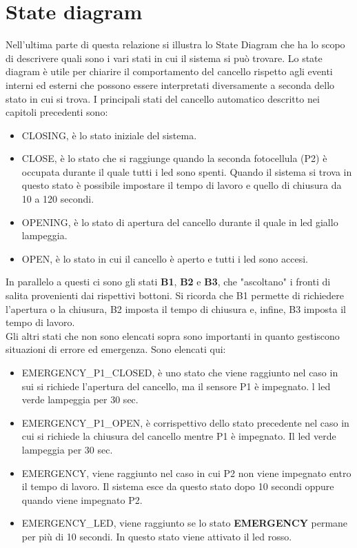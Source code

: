\documentclass[12pt]{article}
\begin{document}
\newpage

\section{State diagram}
Nell'ultima parte di questa relazione si illustra lo State Diagram che ha lo scopo di descrivere quali sono i vari stati in cui il sistema si può trovare. Lo state diagram è utile per chiarire il comportamento del cancello rispetto agli eventi interni ed esterni che possono essere interpretati diversamente a seconda dello stato in cui si trova.
I principali stati del cancello automatico descritto nei capitoli precedenti sono:
\begin{itemize}
    \item{CLOSING,} è lo stato iniziale del sistema.
    \item{CLOSE,} è lo stato che si raggiunge quando la seconda fotocellula (P2) è occupata durante il quale tutti i led sono spenti. Quando il sistema si trova in questo stato è possibile impostare il tempo di lavoro e quello di chiusura da 10 a 120 secondi.
    \item{OPENING,} è lo stato di apertura del cancello durante il quale in led giallo lampeggia.
    \item{OPEN,} è lo stato in cui il cancello è aperto e tutti i led sono accesi.
\end{itemize}

In parallelo a questi ci sono gli stati \textbf{B1}, \textbf{B2} e 
\textbf{B3}, che "ascoltano" i fronti di salita provenienti dai rispettivi bottoni.
Si ricorda che B1 permette di richiedere l'apertura o la chiusura, B2 imposta il tempo di chiusura e, infine, B3 imposta il tempo di lavoro.\\

Gli altri stati che non sono elencati sopra sono importanti in quanto gestiscono situazioni di errore ed emergenza. Sono elencati qui:

\begin{itemize}
    \item{EMERGENCY\_P1\_CLOSED,} è uno stato che viene raggiunto nel caso in sui si richiede l'apertura del cancello, ma il sensore P1 è impegnato. l led verde lampeggia per 30 sec.
    \item{EMERGENCY\_P1\_OPEN,} è corrispettivo dello stato precedente nel caso in cui si richiede la chiusura del cancello mentre P1 è impegnato. Il led verde lampeggia per 30 sec.
    \item{EMERGENCY,} viene raggiunto nel caso in cui P2 non viene impegnato entro il tempo di lavoro. Il sistema esce da questo stato dopo 10 secondi oppure quando viene impegnato P2.
    \item{EMERGENCY\_LED}, viene raggiunto se lo stato \textbf{EMERGENCY} permane per più di 10 secondi. In questo stato viene attivato il led rosso.
\end{itemize}
\end{document}

